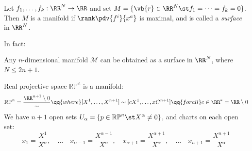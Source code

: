 \documentclass{jknotes}
\begin{document}
\begin{eg}
    Let \(f_1,\dots,f_k:\RR^N\rightarrow\RR\) and set \(M = \{\vb{r}\in\RR^N\st f_1 = \dots = f_k = 0\}\). Then \(M\) is a manifold if \(\rank\pdv{f^i}{x^a}\) is maximal, and is called a \emph{surface} in \(\RR^N\).
\end{eg}
In fact:
\begin{theorem}[Whitney]
    Any \(n\)-dimensional manifold \(\mathcal{M}\) can be obtained as a surface in \(\RR^N\), where \(N \le 2n+1\).
\end{theorem}
\begin{eg}
    Real projective space \(\mathbb{RP^n}\) is a manifold:
    \begin{equation}
        \mathbb{RP}^n = \frac{\RR^{n+1}\setminus{0}}{\sim} \qq{where} [X^1,\dots,X^{n+1}] \sim [cX^1,\dots,xC^{n+1}] \qq{for all} c \in \RR^* = \RR \setminus {0}
    \end{equation}
    We have \(n+1\) open sets \(U_\alpha = \{p\in\mathbb{RP}^n\st X^\alpha \ne 0\}\), and charts on each open set:
    \begin{equation}
        x_1 = \frac{X^1}{X^\alpha},\quad\dots\quad x_{\alpha-1} = \frac{X^{\alpha-1}}{X^\alpha},\quad x_{\alpha+1} = \frac{X^{\alpha+1}}{X^\alpha},\quad \dots\quad x_{n+1} = \frac{X^{n+1}}{X^\alpha}
    \end{equation}
\end{eg}
\end{document}
